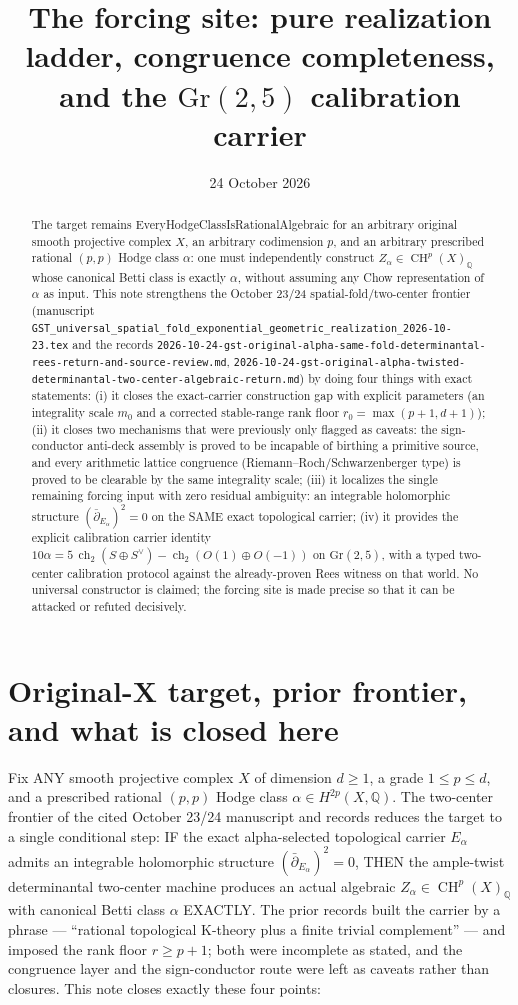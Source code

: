 \documentclass[11pt]{article}
\title{The forcing site: pure realization ladder, congruence completeness,
and the $\mathrm{Gr}(2,5)$ calibration carrier}
\date{24 October 2026}
\newcommand{\ch}{\operatorname{ch}}
\newcommand{\ddbar}{\bar\partial}
\begin{document}
\maketitle
\begin{abstract}
The target remains
EveryHodgeClassIsRationalAlgebraic for an arbitrary original smooth
projective complex $X$, an arbitrary codimension $p$, and an arbitrary
prescribed rational $(p,p)$ Hodge class $\alpha$: one must independently
construct $Z_\alpha\in \operatorname{CH}^p(X)_{\mathbb Q}$ whose canonical
Betti class is exactly $\alpha$, without assuming any Chow representation
of $\alpha$ as input. This note strengthens the October 23/24
spatial-fold/two-center frontier
(manuscript
\texttt{GST\_universal\_spatial\_fold\_exponential\_geometric\_realization\_2026-10-23.tex}
and the records
\texttt{2026-10-24-gst-original-alpha-same-fold-determinantal-rees-return-and-source-review.md},
\texttt{2026-10-24-gst-original-alpha-twisted-determinantal-two-center-algebraic-return.md})
by doing four things with exact statements:
(i) it closes the exact-carrier construction gap with explicit
parameters (an integrality scale $m_0$ and a corrected stable-range rank
floor $r_0=\max(p+1,d+1)$);
(ii) it closes two mechanisms that were previously only flagged as
caveats: the sign-conductor anti-deck assembly is proved to be
incapable of birthing a primitive source, and every
arithmetic lattice congruence (Riemann--Roch/Schwarzenberger type) is
proved to be clearable by the same integrality scale;
(iii) it localizes the single remaining forcing input with zero
residual ambiguity: an integrable holomorphic structure
$(\ddbar_{E_\alpha})^2=0$ on the SAME exact topological carrier;
(iv) it provides the explicit calibration carrier identity
$10\alpha=5\,\ch_2(S\oplus S^\vee)-\ch_2(O(1)\oplus O(-1))$ on
$\mathrm{Gr}(2,5)$, with a typed two-center calibration protocol against
the already-proven Rees witness on that world.
No universal constructor is claimed; the forcing site is made precise
so that it can be attacked or refuted decisively.
\end{abstract}

\section{Original-X target, prior frontier, and what is closed here}
Fix ANY smooth projective complex $X$ of dimension $d\ge 1$, a grade
$1\le p\le d$, and a prescribed rational $(p,p)$ Hodge class
$\alpha\in H^{2p}(X,\mathbb Q)$. The two-center frontier of the cited
October 23/24 manuscript and records reduces the target to a single
conditional step: IF the exact alpha-selected topological carrier
$E_\alpha$ admits an integrable holomorphic structure
$(\ddbar_{E_\alpha})^2=0$, THEN the ample-twist determinantal two-center
machine produces an actual algebraic $Z_\alpha\in\operatorname{CH}^p(X)_{\mathbb Q}$
with canonical Betti class $\alpha$ EXACTLY.
The prior records built the carrier by a phrase --- ``rational
topological K-theory plus a finite trivial complement'' --- and imposed
the rank floor $r\ge p+1$; both were incomplete as stated, and the
congruence layer and the sign-conductor route were left as caveats
rather than closures. This note closes exactly these four points:
\end{document}
